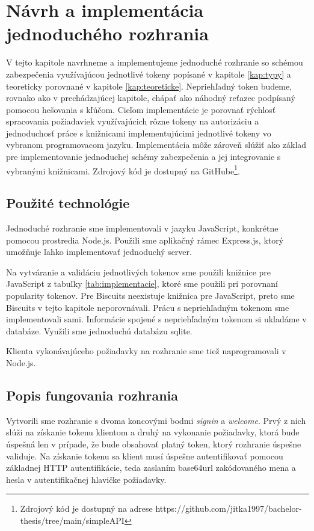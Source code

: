\chapter{Návrh a implementácia jednoduchého rozhrania}

\label{kap:prakticke} %

V tejto kapitole navrhneme a implementujeme jednoduché rozhranie so schémou zabezpečenia využívajúcou jednotlivé tokeny popísané v kapitole \ref{kap:typy} a teoreticky porovnané v kapitole \ref{kap:teoreticke}. Nepriehľadný token budeme, rovnako ako v prechádzajúcej kapitole, chápať ako náhodný reťazec podpísaný pomocou hešovania s kľúčom. Cieľom implementácie je porovnať rýchlosť spracovania požiadaviek využívajúcich rôzne tokeny na autorizáciu a jednoduchosť práce s knižnicami implementujúcimi jednotlivé tokeny vo vybranom programovacom jazyku. Implementácia môže zároveň slúžiť ako základ pre implementovanie jednoduchej schémy zabezpečenia a jej integrovanie s vybranými knižnicami. Zdrojový kód je dostupný na GitHube\footnote{Zdrojový kód je dostupný na adrese https://github.com/jitka1997/bachelor-thesis/tree/main/simpleAPI}.

\section{Použité technológie}

Jednoduché rozhranie sme implementovali v jazyku JavaScript, konkrétne pomocou prostredia Node.js. Použili sme aplikačný rámec Express.js, ktorý umožňuje ľahko implementovať jednoduchý server.

Na vytváranie a validáciu jednotlivých tokenov sme použili knižnice pre JavaScript z tabuľky \ref{tab:implementacie}, ktoré sme použili pri porovnaní popularity tokenov. Pre Biscuits neexistuje knižnica pre JavaScript, preto sme Biscuits v tejto kapitole neporovnávali. Prácu s nepriehľadným tokenom sme implementovali sami. Informácie spojené s nepriehľadným tokenom si ukladáme v databáze. Využili sme jednoduchú databázu sqlite.

Klienta vykonávajúceho požiadavky na rozhranie sme tiež naprogramovali v Node.js.

\section{Popis fungovania rozhrania}

Vytvorili sme rozhranie s dvoma koncovými bodmi \textit{signin} a \textit{welcome}. Prvý z nich slúži na získanie tokenu klientom a druhý na vykonanie požiadavky, ktorá bude úspešná len v prípade, že bude obsahovať platný token, ktorý rozhranie úspešne validuje. Na získanie tokenu sa klient musí úspešne autentifikovať pomocou základnej HTTP autentifikácie, teda zaslaním base64url \cite{base64_rfc} zakódovaného mena a hesla v autentifikačnej hlavičke požiadavky.

